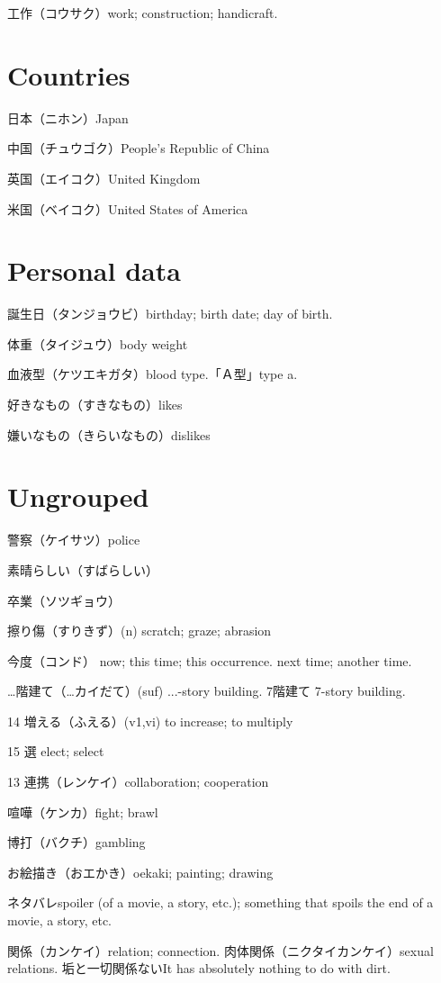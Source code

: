 工作（コウサク）work; construction; handicraft.

\section{Countries}

日本（ニホン）Japan

中国（チュウゴク）People's Republic of China

英国（エイコク）United Kingdom

米国（ベイコク）United States of America

\section{Personal data}

誕生日（タンジョウビ）birthday; birth date; day of birth.

体重（タイジュウ）body weight

血液型（ケツエキガタ）blood type.「Ａ型」type a.

好きなもの（すきなもの）likes

嫌いなもの（きらいなもの）dislikes

\section{Ungrouped}

警察（ケイサツ）police

素晴らしい（すばらしい）

卒業（ソツギョウ）

擦り傷（すりきず）(n) scratch; graze; abrasion

今度（コンド）
now; this time; this occurrence.
next time; another time.

…階建て（…カイだて）(suf) ...-story building.
7階建て 7-story building.

14 増える（ふえる）(v1,vi) to increase; to multiply

15 選 elect; select

13 連携（レンケイ）collaboration; cooperation

喧嘩（ケンカ）fight; brawl

博打（バクチ）gambling

お絵描き（おエかき）oekaki; painting; drawing

ネタバレspoiler (of a movie, a story, etc.); something that spoils the end of a movie, a story, etc.

関係（カンケイ）relation; connection.
肉体関係（ニクタイカンケイ）sexual relations.
垢と一切関係ないIt has absolutely nothing to do with dirt.
